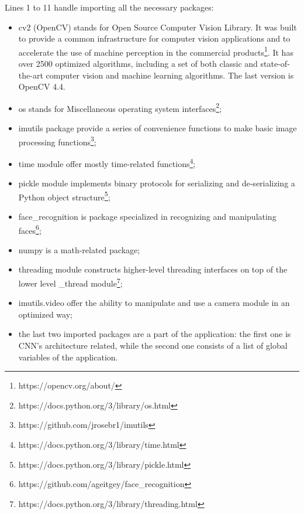 \documentclass[runningheads,a4paper,12pt]{report}
\begin{document}
Lines 1 to 11 handle importing all the necessary packages:
\begin{itemize}

\item cv2 (OpenCV) stands for Open Source Computer Vision Library. It was built to provide a common infrastructure for computer vision applications and to accelerate the use of machine perception in the commercial products\footnote{https://opencv.org/about/}. It has over 2500 optimized algorithms, including a set of both classic and state-of-the-art computer vision and machine learning algorithms. The last version is OpenCV 4.4.

\item os stands for Miscellaneous operating system interfaces\footnote{https://docs.python.org/3/library/os.html};

\item imutils package provide a series of convenience functions to make basic image processing functions\footnote{https://github.com/jrosebr1/imutils};

\item time module offer mostly time-related functions\footnote{https://docs.python.org/3/library/time.html};

\item pickle module implements binary protocols for serializing and de-serializing a Python object structure\footnote{https://docs.python.org/3/library/pickle.html};

\item face\_recognition is package specialized in recognizing and manipulating faces\footnote{https://github.com/ageitgey/face\_recognition};

\item numpy is a math-related package;

\item threading module constructs higher-level threading interfaces on top of the lower level \_thread module\footnote{https://docs.python.org/3/library/threading.html};

\item imutils.video offer the ability to manipulate and use a camera module in an optimized way;

\item the last two imported packages are a part of the application: the first one is CNN's architecture related, while the second one consists of a list of global variables of the application.

\end{itemize}
\end{document}
